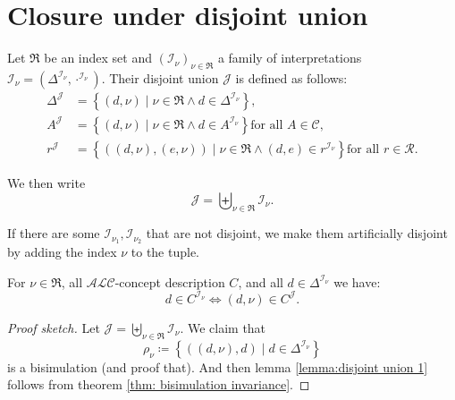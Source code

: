 \section{Closure under disjoint union}
\begin{definition}
	Let $\mathfrak{R}$ be an index set and $\left( \mathcal{I}_{\nu} \right)_{\nu \in \mathfrak{R}}$ a family of interpretations $\mathcal{I}_{\nu} = \left( \Delta^{\mathcal{I}_{\nu}}, \cdot^{\mathcal{I}_{\nu}} \right)$.
	Their disjoint union $\mathcal{J}$ is defined as follows:
	\begin{align*}
		\Delta^{\mathcal{J}} &= \left\{ (d,\nu) \mid \nu \in \mathfrak{R}\land d \in \Delta^{\mathcal{I}_{\nu}} \right\}, \\
		A^{\mathcal{J}} &= \left\{ (d,\nu) \mid \nu \in \mathfrak{R} \land d \in A^{\mathcal{I}_\nu}\right\} \text{for all } A \in \mathscr{C}, \\
		r^{\mathcal{J}} &= \left\{ \left( (d,\nu),(e,\nu) \right) \mid \nu \in \mathfrak{R} \land (d,e) \in r^{\mathcal{I}_\nu} \right\} \text{for all } r \in \mathscr{R}.
	\end{align*}
\end{definition}
\begin{notation}
	We then write
	\[
	\mathcal{J} = \biguplus_{\nu \in \mathfrak{R}} \mathcal{I}_{\nu}
	.\]
\end{notation}
\begin{note}
	If there are some $\mathcal{I}_{\nu_1}, \mathcal{I}_{\nu_2}$ that are not disjoint,
	we make them artificially disjoint by adding the index $\nu$ to the tuple.
\end{note}

\begin{lemma}\label{lemma:disjoint union 1}
	For $\nu \in \mathfrak{R}$, all $\mathcal{ALC}$-concept description $C$, and all $d \in \Delta^{\mathcal{I}_\nu}$ we have:
	\[
		d \in C^{\mathcal{I}_\nu} \iff (d,\nu) \in C^{\mathcal{J}}
	.\]
\end{lemma}
\begin{proof}[Proof sketch]
	Let $\mathcal{J} = \biguplus_{\nu \in \mathfrak{R}} \mathcal{I}_\nu$.
	We claim that
	\[
	\rho_\nu \coloneqq \left\{ \left( (d,\nu),d \right) \mid d \in \Delta^{\mathcal{I}_\nu} \right\}
	\]
	is a bisimulation (and proof that).
	And then lemma \ref{lemma:disjoint union 1} follows from theorem \ref{thm: bisimulation invariance}.
\end{proof}


